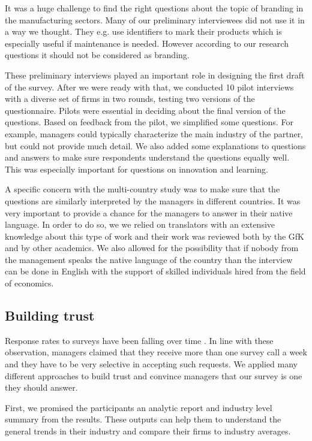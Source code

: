 \documentclass[final, dvipsnames, authoryear,12pt]{elsarticle}
\begin{document}
It was a huge challenge to find the right questions about the topic of branding in the manufacturing sectors. Many of our preliminary interviewees did not use it in a way we thought. They e.g. use identifiers to mark their products which is especially useful if maintenance is needed. However according to our research questions it should not be considered as branding.

These preliminary interviews played an important role in designing the first draft of the survey. After we were ready with that, we conducted 10 pilot interviews with a diverse set of firms in two rounds, testing two versions of the questionnaire. Pilots were essential in deciding about the final version of the questions. Based on feedback from the pilot, we simplified some questions. For example, managers could typically characterize the main industry of the partner, but could not provide much detail. We also added some explanations to questions and answers to make sure respondents understand the questions equally well. This was especially important for questions on innovation and learning. 

A specific concern with the multi-country study was to make sure that the questions are similarly interpreted by the managers in different countries. It was very important to provide a chance for the managers to answer in their native language. In order to do so, we we relied on translators with an extensive knowledge about this type of work and their work was reviewed both by the GfK and by other academics. We also allowed for the possibility that if nobody from the management speaks the native language of the country than the interview can be done in English with the support of skilled individuals hired from the field of economics.

\subsection{Building trust}
\label{sec:trust}

Response rates to surveys have been falling over time \citep{Bloom2014-hc}. In line with these observation, managers claimed that they receive more than one survey call a week and they have to be very selective in accepting such requests. We applied many different approaches to build trust and convince managers that our survey is one they should answer.

First, we promised the participants an analytic report and industry level summary from the results. These outputs can help them to understand the general trends in their industry and compare their firms to industry averages.
\end{document}
